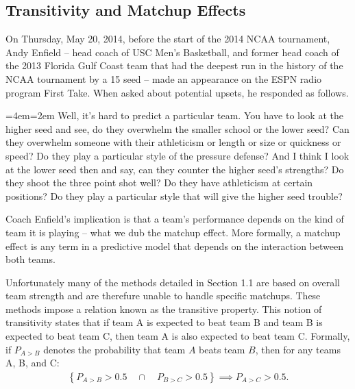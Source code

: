 \documentclass[letterpaper,12pt]{article}
\newenvironment{blockquote}{%
  \par%
  \medskip
  \leftskip=4em\rightskip=2em%
  \noindent\ignorespaces}{%
  \par\medskip}
\begin{document}
\subsection{Transitivity and Matchup Effects}
On Thursday, May 20, 2014, before the start of the 2014 NCAA tournament, Andy Enfield -- head coach of USC Men's Basketball, and former head coach of the 2013 Florida Gulf Coast team that had the deepest run in the history of the NCAA tournament by a 15 seed -- made an appearance on the ESPN radio program First Take. When asked about potential upsets, he responded as follows. 
\begin{blockquote}
Well, it's hard to predict a particular team. You have to look at the higher seed and see, do they overwhelm the smaller school or the lower seed? Can they overwhelm someone with their athleticism or length or size or quickness or speed? Do they play a particular style of the pressure defense? And I think I look at the lower seed then and say, can they counter the higher seed's strengths? Do they shoot the three point shot well? Do they have athleticism at certain positions? Do they play a particular style that will give the higher seed trouble? 
\end{blockquote}
%
\noindent Coach Enfield's implication is that a team's performance depends on the kind of team it is playing -- what we dub the matchup effect. More formally, a matchup effect is any term in a predictive model that depends on the interaction between both teams. 

Unfortunately many of the methods detailed in Section 1.1 are based on overall team strength and are therefure unable to handle specific matchups. These methods impose a relation known as the transitive property. This notion of transitivity states that if team A is expected to beat team B and team B is expected to beat team C, then team A is also expected to beat team C. Formally, if $P_{A>B}$ denotes the probability that team $A$ beats team $B$, then for any teams A, B, and C: 
\begin{eqnarray*}
\left \{P_{A>B} > 0.5 \quad \cap \quad P_{B>C} > 0.5 \right\} \implies P_{A>C} > 0.5.
\label{eq:trans}
\end{eqnarray*}
\end{document}
